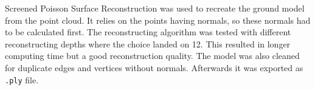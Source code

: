         Screened Poisson Surface Reconstruction\cite{kazhdan2013screened} was used to recreate the ground model from the point cloud. It relies on the points having normals, so these normals had to be calculated first. The reconstructing algorithm was tested with different reconstructing depths where the choice landed on 12. This resulted in longer computing time but a good reconstruction quality. The model was also cleaned for duplicate edges and vertices without normals. Afterwards it was exported as \texttt{.ply} file.
        
        
        
    
